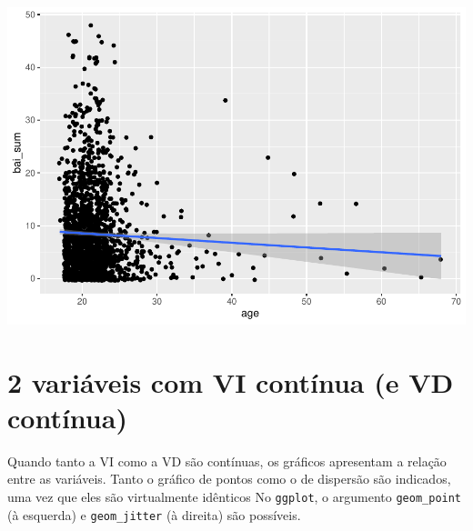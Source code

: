 \documentclass[
]{book}
\newenvironment{Shaded}{\begin{snugshade}}{\end{snugshade}}
\newcommand{\CommentTok}[1]{\textcolor[rgb]{0.56,0.35,0.01}{\textit{#1}}}
\newcommand{\DataTypeTok}[1]{\textcolor[rgb]{0.13,0.29,0.53}{#1}}
\newcommand{\DecValTok}[1]{\textcolor[rgb]{0.00,0.00,0.81}{#1}}
\newcommand{\KeywordTok}[1]{\textcolor[rgb]{0.13,0.29,0.53}{\textbf{#1}}}
\newcommand{\NormalTok}[1]{#1}
\newcommand{\OperatorTok}[1]{\textcolor[rgb]{0.81,0.36,0.00}{\textbf{#1}}}
\newcommand{\StringTok}[1]{\textcolor[rgb]{0.31,0.60,0.02}{#1}}
\begin{document}
\begin{center}\includegraphics{gitbook-demo_files/figure-latex/unnamed-chunk-24-1} \end{center}

\hypertarget{variuxe1veis-com-vi-contuxednua-e-vd-contuxednua}{%
\section{2 variáveis com VI contínua (e VD contínua)}\label{variuxe1veis-com-vi-contuxednua-e-vd-contuxednua}}

Quando tanto a VI como a VD são contínuas, os gráficos apresentam a relação entre as variáveis. Tanto o gráfico de pontos como o de dispersão são indicados, uma vez que eles são virtualmente idênticos No \texttt{ggplot}, o argumento \texttt{geom\_point} (à esquerda) e \texttt{geom\_jitter} (à direita) são possíveis.

\begin{Shaded}
\end{Shaded}
\end{document}
